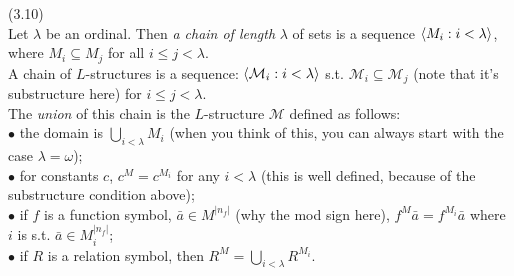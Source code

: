 \documentclass[a4paper]{article}
\begin{document}
\begin{defi} (3.10)\\
    Let $\lambda$ be an ordinal. Then \emph{a chain of length} $\lambda$ of sets is a sequence $\langle M_i : i < \lambda \rangle$, where $M_i \subseteq M_j$ for all $i \leq j < \lambda$.\\
    A chain of $L$-structures is a sequence: $\langle \mathcal{M}_i: i < \lambda \rangle$ s.t. $\mathcal{M}_i \subseteq \mathcal{M}_j$ (note that it's substructure here) for $i \leq j < \lambda$.\\
    The \emph{union} of this chain is the $L$-structure $\mathcal{M}$ defined as follows:\\
    $\bullet$ the domain is $\bigcup_{i<\lambda} M_i$ (when you think of this, you can always start with the case $\lambda = \omega$);\\
    $\bullet$ for constants $c$, $c^M = c^{M_i}$ for any $i<\lambda$ (this is well defined, because of the substructure condition above);\\
    $\bullet$ if $f$ is a function symbol, $\bar{a} \in M^{|n_f|}$ (why the mod sign here), $f^M \bar{a} = f^{M_i} \bar{a}$ where $i$ is s.t. $\bar{a} \in M_i^{|n_f|}$;\\
    $\bullet$ if $R$ is a relation symbol, then $R^M = \bigcup_{i < \lambda} R^{M_i}$.
\end{defi}
\end{document}
